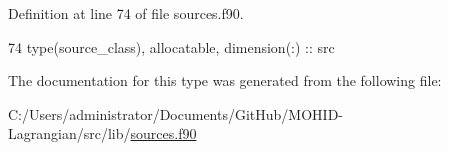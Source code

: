 Definition at line 74 of file sources.\+f90.


\begin{DoxyCode}
74         \textcolor{keywordtype}{type}(source\_class), \textcolor{keywordtype}{allocatable}, \textcolor{keywordtype}{dimension(:)} :: src
\end{DoxyCode}


The documentation for this type was generated from the following file\+:\begin{DoxyCompactItemize}
\item 
C\+:/\+Users/administrator/\+Documents/\+Git\+Hub/\+M\+O\+H\+I\+D-\/\+Lagrangian/src/lib/\mbox{\hyperlink{sources_8f90}{sources.\+f90}}\end{DoxyCompactItemize}

